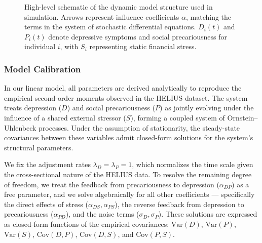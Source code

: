 \documentclass[
]{article}
\begin{document}
\begin{figure}


\caption{\label{fig-concept}High-level schematic of the dynamic model
structure used in simulation. Arrows represent influence coefficients
\(\alpha\), matching the terms in the system of stochastic differential
equations. \(D_i(t)\) and \(P_i(t)\) denote depressive symptoms and
social precariousness for individual \(i\), with \(S_i\) representing
static financial stress.}

\end{figure}%

\subsubsection{Model Calibration}\label{sec-calibration}

In our linear model, all parameters are derived analytically to
reproduce the empirical second-order moments observed in the HELIUS
dataset. The system treats depression (\(D\)) and social precariousness
(\(P\)) as jointly evolving under the influence of a shared external
stressor (\(S\)), forming a coupled system of Ornstein--Uhlenbeck
processes. Under the assumption of stationarity, the steady-state
covariances between these variables admit closed-form solutions for the
system's structural parameters.

We fix the adjustment rates \(\lambda_D = \lambda_P = 1\), which
normalizes the time scale given the cross-sectional nature of the HELIUS
data. To resolve the remaining degree of freedom, we treat the feedback
from precariousness to depression (\(\alpha_{DP}\)) as a free parameter,
and we solve algebraically for all other coefficients --- specifically
the direct effects of stress (\(\alpha_{DS}, \alpha_{PS}\)), the reverse
feedback from depression to precariousness (\(\alpha_{PD}\)), and the
noise terms (\(\sigma_D, \sigma_P\)). These solutions are expressed as
closed-form functions of the empirical covariances: \(\mathrm{Var}(D)\),
\(\mathrm{Var}(P)\), \(\mathrm{Var}(S)\), \(\mathrm{Cov}(D, P)\),
\(\mathrm{Cov}(D, S)\), and \(\mathrm{Cov}(P, S)\).
\end{document}
